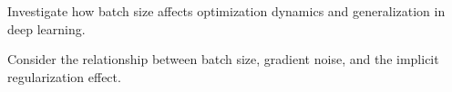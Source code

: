 \begin{exercisebox}[hard]
\begin{problem}
Investigate how batch size affects optimization dynamics and generalization in deep learning.
\end{problem}
\begin{hintbox}
Consider the relationship between batch size, gradient noise, and the implicit regularization effect.
\end{hintbox}
\end{exercisebox}


